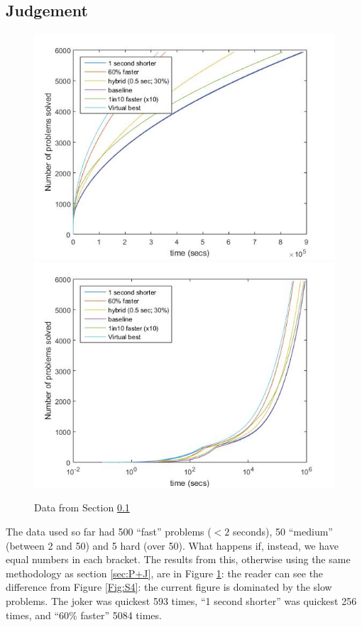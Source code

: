 \documentclass{easychair}
\begin{document}
\subsection{Judgement}\label{sec:J}
\begin{figure}[h]
\caption{Data from Section \ref{sec:J}\label{Fig:S5}}
\includegraphics[scale=0.60]{Fig5a.jpg}
\includegraphics[scale=0.60]{Fig5b.jpg}
\end{figure}
The data used so far had 500 ``fast'' problems ($<2$ seconds), 50 ``medium''  (between 2 and 50) and 5 hard (over 50). What happens if, instead, we have equal numbers in each bracket. The results from this, otherwise using the same methodology as section \ref{sec:P+J}, are in Figure \ref{Fig:S5}: the reader can see the difference from Figure \ref{Fig:S4}: the current figure is dominated by the slow problems. The joker was quickest 593 times, ``1 second shorter'' was quickest 256 times, and ``60\% faster'' 5084 times.
\end{document}

